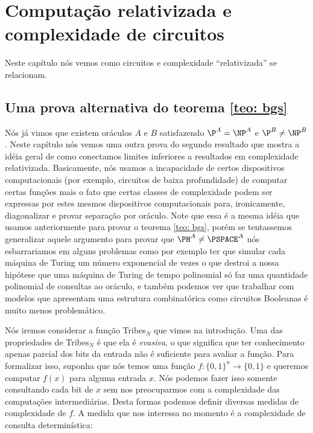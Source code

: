 \chapter{Computação relativizada e complexidade de circuitos} \label{chapter_oracles_and_circuit_complexity}

Neste capítulo nós vemos como circuitos e complexidade ``relativizada'' se relacionam.

\section{Uma prova alternativa do teorema \ref{teo: bgs}} \label{section_alternative_proof_bgs}

Nós já vimos que existem oráculos $A$ e $B$ satisfazendo $\P^{A} = \NP^{A}$ e $\P^{B} \neq \NP^{B}$. Neste capítulo nós vemos uma outra prova do segundo resultado que mostra a idéia geral de como conectamos limites inferiores a resultados em complexidade relativizada. Basicamente, nós usamos a incapacidade de certos dispositivos computacionais (por exemplo, circuitos de baixa profundidade) de computar certas funções mais o fato que certas classes de complexidade podem ser expressas por estes mesmos dispositivos computacionais para, ironicamente, diagonalizar e provar separação por oráculo. Note que essa é a mesma idéia que usamos anteriormente para provar o teorema \ref{teo: bgs}, porém se tentassemos generalizar aquele argumento para provar que $\PH^{A} \neq \PSPACE^{A}$ nós esbarrariamos em alguns problemas como por exemplo ter que simular cada máquina de Turing um número exponencial de vezes o que destroi a nossa hipótese que uma máquina de Turing de tempo polinomial só faz uma quantidade polinomial de consultas ao oráculo, e também podemos ver que trabalhar com modelos que apresentam uma estrutura combinatórica como circuitos Booleanas é muito menos problemático.

Nós iremos considerar a função Tribes$_{N}$ que vimos na introdução. Uma das propriedades de Tribes$_{N}$ é que ela é \emph{evasiva}, o que significa que ter conhecimento apenas parcial dos bits da entrada não é suficiente para avaliar a função. Para formalizar isso, suponha que nós temos uma função $f: \{0, 1\}^{n} \to \{0, 1\}$ e queremos computar $f(x)$ para alguma entrada $x$. Nós podemos fazer isso somente consultando cada bit de $x$ sem nos preocuparmos com a complexidade das computações intermediárias. Desta formas podemos definir diversas medidas de complexidade de $f$. A medida que nos interessa no momento é a complexidade de consulta determinística:

